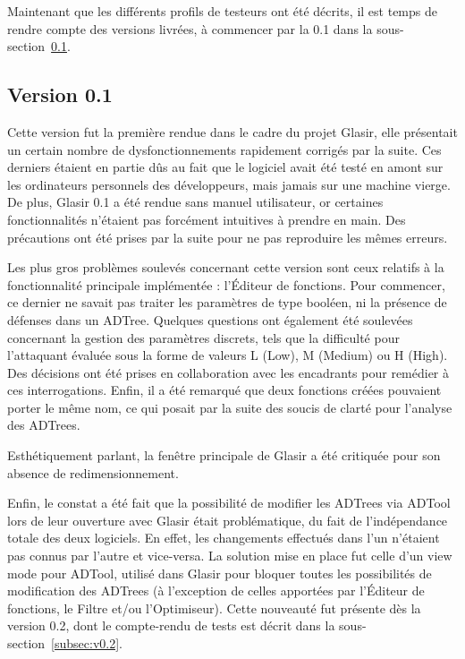 Maintenant que les différents profils de testeurs ont été décrits, il est temps de rendre compte des versions livrées, à commencer par la 0.1 dans la {\sc sous-section}~\ref{subsec:v0.1}.

\subsection{Version 0.1}
\label{subsec:v0.1}

Cette version fut la première rendue dans le cadre du projet Glasir, elle présentait un certain nombre de dysfonctionnements rapidement corrigés par la suite. Ces derniers étaient en partie dûs au fait que le logiciel avait été testé en amont sur les ordinateurs personnels des développeurs, mais jamais sur une machine vierge. De plus, Glasir 0.1 a été rendue sans manuel utilisateur, or certaines fonctionnalités n'étaient pas forcément intuitives à prendre en main. Des précautions ont été prises par la suite pour ne pas reproduire les mêmes erreurs.

Les plus gros problèmes soulevés concernant cette version sont ceux relatifs à la fonctionnalité principale implémentée : l'Éditeur de fonctions. Pour commencer, ce dernier ne savait pas traiter les paramètres de type booléen, ni la présence de défenses dans un ADTree. Quelques questions ont également été soulevées concernant la gestion des paramètres discrets, tels que la difficulté pour l'attaquant évaluée sous la forme de valeurs L (Low), M (Medium) ou H (High). Des décisions ont été prises en collaboration avec les encadrants pour remédier à ces interrogations. Enfin, il a été remarqué que deux fonctions créées pouvaient porter le même nom, ce qui posait par la suite des soucis de clarté pour l'analyse des ADTrees.

Esthétiquement parlant, la fenêtre principale de Glasir a été critiquée pour son absence de redimensionnement. 

Enfin, le constat a été fait que la possibilité de modifier les ADTrees via ADTool lors de leur ouverture avec Glasir était problématique, du fait de l'indépendance totale des deux logiciels. En effet, les changements effectués dans l'un n'étaient pas connus par l'autre et vice-versa. La solution mise en place fut celle d'un \og view mode \fg{} pour ADTool, utilisé dans Glasir pour bloquer toutes les possibilités de modification des ADTrees (à l'exception de celles apportées par l'Éditeur de fonctions, le Filtre et/ou l'Optimiseur). Cette nouveauté fut présente dès la version 0.2, dont le compte-rendu de tests est décrit dans la {\sc sous-section}~\ref{subsec:v0.2}.

